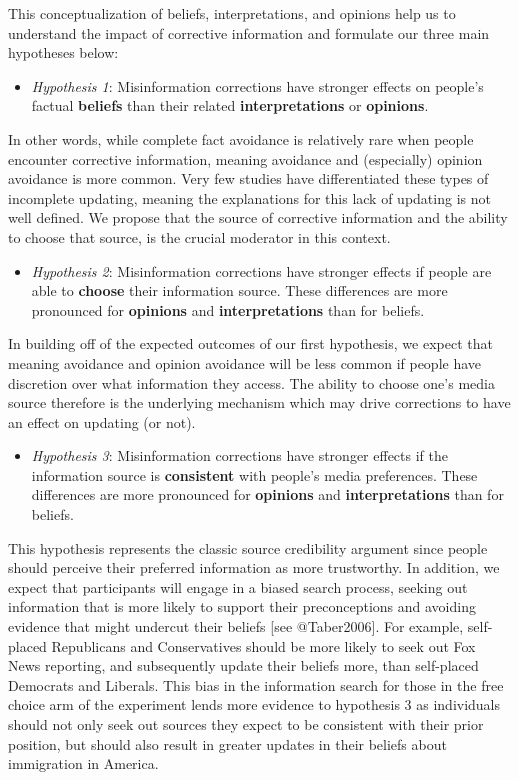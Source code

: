 \documentclass[
]{article}
\providecommand{\tightlist}{%
  \setlength{\itemsep}{0pt}\setlength{\parskip}{0pt}}
\begin{document}
This conceptualization of beliefs, interpretations, and opinions help us
to understand the impact of corrective information and formulate our
three main hypotheses below:

\begin{itemize}
\tightlist
\item
  \emph{Hypothesis 1}: Misinformation corrections have stronger effects
  on people's factual \textbf{beliefs} than their related
  \textbf{interpretations} or \textbf{opinions}.
\end{itemize}

In other words, while complete fact avoidance is relatively rare when
people encounter corrective information, meaning avoidance and
(especially) opinion avoidance is more common. Very few studies have
differentiated these types of incomplete updating, meaning the
explanations for this lack of updating is not well defined. We propose
that the source of corrective information and the ability to choose that
source, is the crucial moderator in this context.

\begin{itemize}
\tightlist
\item
  \emph{Hypothesis 2}: Misinformation corrections have stronger effects
  if people are able to \textbf{choose} their information source. These
  differences are more pronounced for \textbf{opinions} and
  \textbf{interpretations} than for beliefs.
\end{itemize}

In building off of the expected outcomes of our first hypothesis, we
expect that meaning avoidance and opinion avoidance will be less common
if people have discretion over what information they access. The ability
to choose one's media source therefore is the underlying mechanism which
may drive corrections to have an effect on updating (or not).

\begin{itemize}
\tightlist
\item
  \emph{Hypothesis 3}: Misinformation corrections have stronger effects
  if the information source is \textbf{consistent} with people's media
  preferences. These differences are more pronounced for
  \textbf{opinions} and \textbf{interpretations} than for beliefs.
\end{itemize}

This hypothesis represents the classic source credibility argument since
people should perceive their preferred information as more trustworthy.
In addition, we expect that participants will engage in a biased search
process, seeking out information that is more likely to support their
preconceptions and avoiding evidence that might undercut their beliefs
{[}see @Taber2006{]}. For example, self-placed Republicans and
Conservatives should be more likely to seek out Fox News reporting, and
subsequently update their beliefs more, than self-placed Democrats and
Liberals. This bias in the information search for those in the free
choice arm of the experiment lends more evidence to hypothesis 3 as
individuals should not only seek out sources they expect to be
consistent with their prior position, but should also result in greater
updates in their beliefs about immigration in America.
\end{document}
